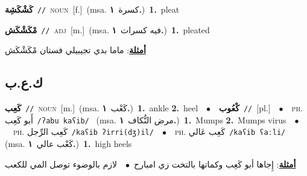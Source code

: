\documentclass[10pt,a4paper,twoside]{article} %
\begin{document}
\begin{multicols}{2}
{\setlength\topsep{0pt}\textbf{\foreignlanguage{arabic}{كَشْكَشِة}}\ {\color{gray}\texttt{//}\color{black}}\ \textsc{noun}\ [f.]\ \color{gray}(msa. \foreignlanguage{arabic}{كسرة}~\foreignlanguage{arabic}{\textbf{١.}})\color{black}\ \textbf{1.}~pleat\ } \vspace{2mm}

{\setlength\topsep{0pt}\textbf{\foreignlanguage{arabic}{مْكَشْكَش}}\ {\color{gray}\texttt{//}\color{black}}\ \textsc{adj}\ [m.]\ \color{gray}(msa. \foreignlanguage{arabic}{فيه كسرات}~\foreignlanguage{arabic}{\textbf{١.}})\color{black}\ \textbf{1.}~pleated\  \begin{flushright}\color{gray}\foreignlanguage{arabic}{\textbf{\underline{\foreignlanguage{arabic}{أمثلة}}}: ماما بدي تجيبيلي فستان مْكَشْكَش}\end{flushright}\color{black}} \vspace{2mm}

\vspace{-3mm}
\subsection*{\color{blue}\foreignlanguage{arabic}{ك.ع.ب}\color{blue}{}} 

{\setlength\topsep{0pt}\textbf{\foreignlanguage{arabic}{كَعِب}}\ {\color{gray}\texttt{//}\color{black}}\ \textsc{noun}\ [m.]\ \color{gray}(msa. \foreignlanguage{arabic}{كَعْب}~\foreignlanguage{arabic}{\textbf{١.}})\color{black}\ \textbf{1.}~ankle  \textbf{2.}~heel\ \ $\bullet$\ \ \setlength\topsep{0pt}\textbf{\foreignlanguage{arabic}{كْعُوب}}\ {\color{gray}\texttt{//}\color{black}}\ [pl.]\ \ $\bullet$\ \ \textsc{ph.} \color{gray} \foreignlanguage{arabic}{أَبو كَعِب}\color{black}\ {\color{gray}\texttt{/{\sffamily ʔabu kaʕib}/}\color{black}}\ \color{gray} (msa. \foreignlanguage{arabic}{مرض النُّكاف}~\foreignlanguage{arabic}{\textbf{١.}})\color{black}\ \textbf{1.}~Mumps  \textbf{2.}~Mumps virus\ \ $\bullet$\ \ \textsc{ph.} \color{gray} \foreignlanguage{arabic}{كَعِب الرِّجل}\color{black}\ {\color{gray}\texttt{/{\sffamily kaʕib ʔirri(dʒ)il}/}\color{black}}\ \ $\bullet$\ \ \textsc{ph.} \color{gray} \foreignlanguage{arabic}{كَعِب عَالي}\color{black}\ {\color{gray}\texttt{/{\sffamily kaʕib ʕaːli}/}\color{black}}\ \color{gray} (msa. \foreignlanguage{arabic}{كَعْب عالي}~\foreignlanguage{arabic}{\textbf{١.}})\color{black}\ \textbf{1.}~high heels\  \begin{flushright}\color{gray}\foreignlanguage{arabic}{\textbf{\underline{\foreignlanguage{arabic}{أمثلة}}}: إِجاها أبو كَعِب وكماتها بالتخت زي امبارح\ $\bullet$\ \  لازم بالوضوء توصل المي للكعب}\end{flushright}\color{black}} \vspace{2mm}


\end{multicols}
\end{document}
